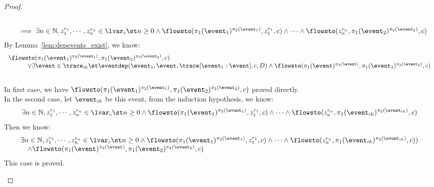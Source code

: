 \begin{proof}
\begin{case}
\[\begin{array}{l}
          \\ \quad 
          \implies 
          \exists n \in \mathbb{N}, z_1^{r_1}, \cdots, z_n^{r_n} \in \lvar_{{c}} \st n \geq 0 \land
          \flowsto(\pi_1(\event_1)^{\pi_2(\event_1)},  z_1^{r_1}, c) 
          \land \cdots \land \flowsto(z_n^{r_n}, \pi_1(\event_2)^{\pi_2(\event_2)}, c) 
        \end{array}
        \]
        By Lemma~\ref{lem:depevents_exist}, we know:
        \[
          \begin{array}{l}
            \flowsto(\pi_1(\event_1)^{\pi_2(\event_1)}, \pi_1(\event_2)^{\pi_2(\event_2)}, c) 
        \\ \qquad \quad \lor
        \exists \event \in \trace_{ih} \st 
          \eventdep(\event_1, \event, \trace[\event_1:\event], c, D)
        \land 
        \flowsto(\pi_1(\event)^{\pi_2(\event)}, \pi_1(\event_2)^{\pi_2(\event_2)}, c) 
      \end{array}
      \]
        \\
        In first case, we have $\flowsto(\pi_1(\event_1)^{\pi_2(\event_1)}, \pi_1(\event_2)^{\pi_2(\event_2)}, c) $ proved directly.
        \\
        In the second case, let $\event_{ih}$ be this event, from the induction hypothesis, we know:
        \[
          \exists n \in \mathbb{N}, z_1^{r_1}, \cdots, z_n^{r_n} \in \lvar_{{c}} \st n \geq 0 \land
            \flowsto(\pi_1(\event_1)^{\pi_2(\event_1)},  z_1^{r_1}, c) 
            \land \cdots \land \flowsto(z_n^{r_n}, \pi_1(\event_{ih})^{\pi_2(\event_{ih})}, c) 
          \]
          Then we know:
          \[
            \begin{array}{l}
              \exists n \in \mathbb{N}, z_1^{r_1}, \cdots, z_n^{r_n} \in \lvar_{{c}} \st n \geq 0 \land
            \flowsto(\pi_1(\event_1)^{\pi_2(\event_1)},  z_1^{r_1}, c) 
            \land \cdots \land \flowsto(z_n^{r_n}, \pi_1(\event_{ih})^{\pi_2(\event_{ih})}, c) )
             \\ \quad  
             \land  \flowsto(\pi_1(\event)^{\pi_2(\event)}, \pi_1(\event_2)^{\pi_2(\event_2)}, c) 
            \end{array}
            \]
            This case is proved.
      \end{case}


\end{proof}
